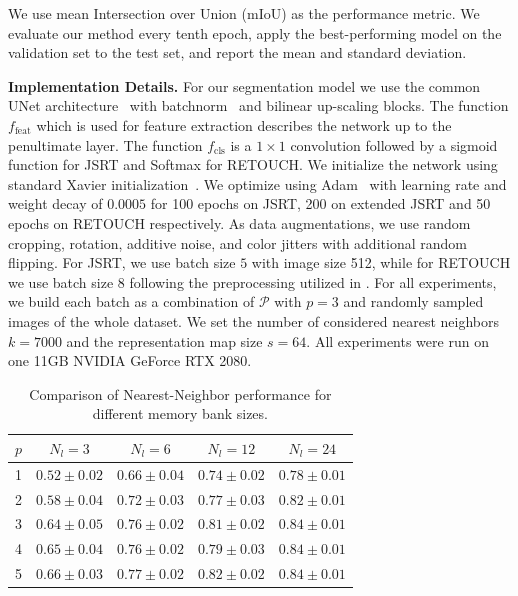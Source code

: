 \documentclass[letterpaper]{article} %
\begin{document}
 We use mean Intersection over Union (mIoU) as the performance metric. We evaluate our method every tenth epoch, apply the best-performing model on the validation set to the test set, and report the mean and standard deviation.


\noindent\textbf{Implementation Details.}
For our segmentation model we use the common UNet architecture~\cite{ronneberger2015u} with batchnorm~\cite{ioffe2015batch} and bilinear up-scaling blocks. The function $f_{\text{feat}}$ which is used for feature extraction describes the network up to the penultimate layer. The function $f_{\text{cls}}$ is a $1\times1$ convolution followed by a sigmoid function for JSRT and Softmax for RETOUCH. We initialize the network using standard Xavier initialization~\cite{glorot2010understanding}. We optimize using Adam~\cite{kingma2014adam} with learning rate and weight decay of $0.0005$ for 100 epochs on JSRT, 200 on extended JSRT and 50 epochs on RETOUCH respectively. As data augmentations, we use random cropping, rotation, additive noise, and color jitters with additional random flipping. For JSRT, we use batch size $5$ with image size 512, while for RETOUCH we use batch size $8$ following the preprocessing utilized in \cite{reiss2021every}. For all experiments, we build each batch as a combination of $\mathcal{P}$ with $p=3$ and randomly sampled images of the whole dataset. We set the number of considered nearest neighbors $k=7000$ and the representation map size $s=64$. All experiments were run on one 11GB NVIDIA GeForce RTX 2080.


\begin{table}[tp]

  \centering
  \footnotesize
  \begin{tabular}{ccccc}
    \toprule
      $p$ &$N_l=3$ & $N_l=6$ & $N_l=12$ & $N_l=24$ \\ \midrule
     1 & $0.52\pm0.02$ & $0.66\pm0.04$ & $0.74\pm0.02$ & $0.78\pm0.01$ \\
     2 & $0.58\pm0.04$ & $0.72\pm0.03$ & $0.77\pm0.03$ & $0.82\pm0.01$ \\
     3 & $0.64\pm0.05$ & $0.76\pm0.02$ & $0.81\pm0.02$ & $0.84\pm0.01$ \\
     4 & $0.65\pm0.04$ & $0.76\pm0.02$ & $0.79\pm0.03$ & $0.84\pm0.01$ \\
     5 & $0.66\pm0.03$ & $0.77\pm0.02$ & $0.82\pm0.02$ & $0.84\pm0.01$ \\
     \bottomrule
  \end{tabular}
  \caption{Comparison of Nearest-Neighbor performance for different memory bank sizes.}
  \label{table:abl_nn}
\end{table}
\end{document}
